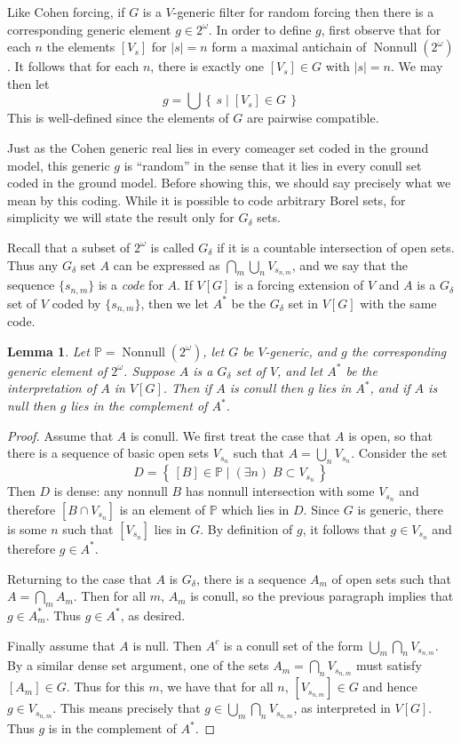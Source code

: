 \documentclass[11pt,oneside]{amsbook}
\newcommand{\set}[1]{\left\{\,#1\,\right\}}
\newcommand{\PP}{\mathbb P}
\DeclareMathOperator{\Nonnull}{Nonnull}
\theoremstyle{definition}
\theoremstyle{plain}
\newtheorem{lemma}[theorem]{Lemma}
\theoremstyle{definition}
\theoremstyle{remark}
\numberwithin{equation}{section}
\numberwithin{figure}{section}
\begin{document}
Like Cohen forcing, if $G$ is a $V$-generic filter for random forcing then there is a corresponding generic element $g\in2^\omega$. In order to define $g$, first observe that for each $n$ the elements $[V_s]$ for $|s|=n$ form a maximal antichain of $\Nonnull(2^\omega)$. It follows that for each $n$, there is exactly one $[V_s]\in G$ with $|s|=n$. We may then let
\[g=\bigcup\set{s\mid [V_s]\in G}
\]
This is well-defined since the elements of $G$ are pairwise compatible.

Just as the Cohen generic real lies in every comeager set coded in the ground model, this generic $g$ is ``random'' in the sense that it lies in every conull set coded in the ground model. Before showing this, we should say precisely what we mean by this coding. While it is possible to code arbitrary Borel sets, for simplicity we will state the result only for $G_\delta$ sets.

Recall that a subset of $2^\omega$ is called $G_\delta$ if it is a countable intersection of open sets. Thus any $G_\delta$ set $A$ can be expressed as $\bigcap_m\bigcup_nV_{s_{n,m}}$, and we say that the sequence $\{s_{n,m}\}$ is a \emph{code} for $A$. If $V[G]$ is a forcing extension of $V$ and $A$ is a $G_\delta$ set of $V$ coded by $\{s_{n,m}\}$, then we let $A^*$ be the $G_\delta$ set in $V[G]$ with the same code.

\begin{lemma}
  \label{lem:random-conull}
  Let $\PP=\Nonnull(2^\omega)$, let $G$ be $V$-generic, and $g$ the corresponding generic element of $2^\omega$. Suppose $A$ is a $G_\delta$ set of $V$, and let $A^*$ be the interpretation of $A$ in $V[G]$. Then if $A$ is conull then $g$ lies in $A^*$, and if $A$ is null then $g$ lies in the complement of $A^*$.
\end{lemma}

\begin{proof}
  Assume that $A$ is conull. We first treat the case that $A$ is open, so that there is a sequence of basic open sets $V_{s_n}$ such that $A=\bigcup_nV_{s_n}$. Consider the set
  \[D=\set{[B]\in\PP\mid (\exists n)\;B\subset V_{s_n}}
  \]
  Then $D$ is dense: any nonnull $B$ has nonnull intersection with some $V_{s_n}$ and therefore $[B\cap V_{s_n}]$ is an element of $\PP$ which lies in $D$. Since $G$ is generic, there is some $n$ such that $[V_{s_n}]$ lies in $G$. By definition of $g$, it follows that $g\in V_{s_n}$ and therefore $g\in A^*$.

  Returning to the case that $A$ is $G_\delta$, there is a sequence $A_m$ of open sets such that $A=\bigcap_mA_m$. Then for all $m$, $A_m$ is conull, so the previous paragraph implies that $g\in A_m^*$. Thus $g\in A^*$, as desired.

  Finally assume that $A$ is null. Then $A^c$ is a conull set of the form $\bigcup_m\bigcap_nV_{s_{n,m}}$. By a similar dense set argument, one of the sets $A_m=\bigcap_nV_{s_{n,m}}$ must satisfy $[A_m]\in G$. Thus for this $m$, we have that for all $n$, $[V_{s_{n,m}}]\in G$ and hence $g\in V_{s_{n,m}}$. This means precisely that $g\in\bigcup_m\bigcap_nV_{s_{n,m}}$, as interpreted in $V[G]$. Thus $g$ is in the complement of $A^*$.
\end{proof}
\end{document}
